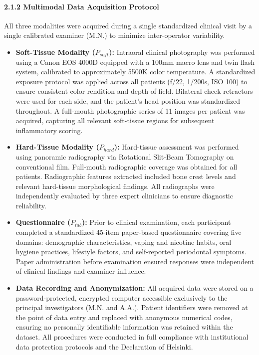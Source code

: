 \documentclass[
]{article}
\begin{document}
\paragraph{\texorpdfstring{\textbf{2.1.2 Multimodal Data Acquisition
Protocol}}{2.1.2 Multimodal Data Acquisition Protocol}}\label{multimodal-data-acquisition-protocol}

All three modalities were acquired during a single standardized clinical
visit by a single calibrated examiner (M.N.) to minimize inter-operator
variability.

\begin{itemize}
\item
  \textbf{Soft-Tissue Modality (\(P_{soft}\)):} Intraoral clinical
  photography was performed using a Canon EOS 4000D equipped with a
  100mm macro lens and twin flash system, calibrated to approximately
  5500K color temperature. A standardized exposure protocol was applied
  across all patients (f/22, 1/200s, ISO 100) to ensure consistent color
  rendition and depth of field. Bilateral cheek retractors were used for
  each side, and the patient's head position was standardized
  throughout. A full-mouth photographic series of 11 images per patient
  was acquired, capturing all relevant soft-tissue regions for
  subsequent inflammatory scoring.
\item
  \textbf{Hard-Tissue Modality (\(P_{hard}\)):} Hard-tissue assessment
  was performed using panoramic radiography via Rotational Slit-Beam
  Tomography on conventional film. Full-mouth radiographic coverage was
  obtained for all patients. Radiographic features extracted included
  bone crest levels and relevant hard-tissue morphological findings. All
  radiographs were independently evaluated by three expert clinicians to
  ensure diagnostic reliability.
\item
  \textbf{Questionnaire (\(P_{tab}\)):} Prior to clinical examination,
  each participant completed a standardized 45-item paper-based
  questionnaire covering five domains: demographic characteristics,
  vaping and nicotine habits, oral hygiene practices, lifestyle factors,
  and self-reported periodontal symptoms. Paper administration before
  examination ensured responses were independent of clinical findings
  and examiner influence.
\item
  \textbf{Data Recording and Anonymization:} All acquired data were
  stored on a password-protected, encrypted computer accessible
  exclusively to the principal investigators (M.N. and A.A.). Patient
  identifiers were removed at the point of data entry and replaced with
  anonymous numerical codes, ensuring no personally identifiable
  information was retained within the dataset. All procedures were
  conducted in full compliance with institutional data protection
  protocols and the Declaration of Helsinki.
\end{itemize}
\end{document}
